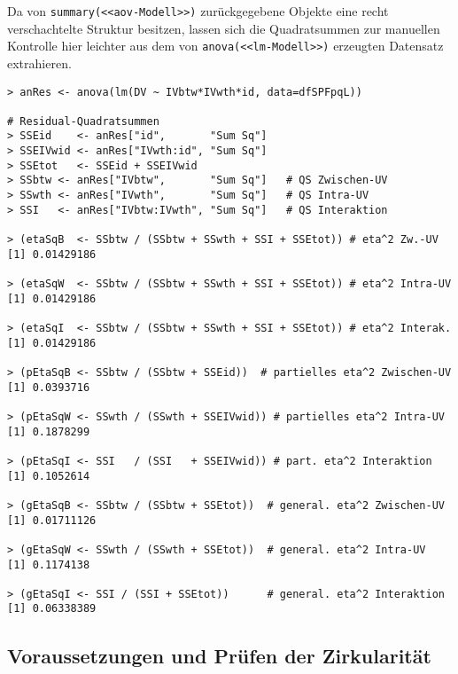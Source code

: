 Da von \lstinline!summary(<<aov-Modell>>)! zurückgegebene Objekte eine recht verschachtelte Struktur besitzen, lassen sich die Quadratsummen zur manuellen Kontrolle hier leichter aus dem von \lstinline!anova(<<lm-Modell>>)! erzeugten Datensatz extrahieren.
\begin{lstlisting}
> anRes <- anova(lm(DV ~ IVbtw*IVwth*id, data=dfSPFpqL))

# Residual-Quadratsummen
> SSEid    <- anRes["id",       "Sum Sq"]
> SSEIVwid <- anRes["IVwth:id", "Sum Sq"]
> SSEtot   <- SSEid + SSEIVwid
> SSbtw <- anRes["IVbtw",       "Sum Sq"]   # QS Zwischen-UV
> SSwth <- anRes["IVwth",       "Sum Sq"]   # QS Intra-UV
> SSI   <- anRes["IVbtw:IVwth", "Sum Sq"]   # QS Interaktion

> (etaSqB  <- SSbtw / (SSbtw + SSwth + SSI + SSEtot)) # eta^2 Zw.-UV
[1] 0.01429186

> (etaSqW  <- SSbtw / (SSbtw + SSwth + SSI + SSEtot)) # eta^2 Intra-UV
[1] 0.01429186

> (etaSqI  <- SSbtw / (SSbtw + SSwth + SSI + SSEtot)) # eta^2 Interak.
[1] 0.01429186

> (pEtaSqB <- SSbtw / (SSbtw + SSEid))  # partielles eta^2 Zwischen-UV
[1] 0.0393716

> (pEtaSqW <- SSwth / (SSwth + SSEIVwid)) # partielles eta^2 Intra-UV
[1] 0.1878299

> (pEtaSqI <- SSI   / (SSI   + SSEIVwid)) # part. eta^2 Interaktion
[1] 0.1052614

> (gEtaSqB <- SSbtw / (SSbtw + SSEtot))  # general. eta^2 Zwischen-UV
[1] 0.01711126

> (gEtaSqW <- SSwth / (SSwth + SSEtot))  # general. eta^2 Intra-UV
[1] 0.1174138

> (gEtaSqI <- SSI / (SSI + SSEtot))      # general. eta^2 Interaktion
[1] 0.06338389
\end{lstlisting}

\subsection{Voraussetzungen und Prüfen der Zirkularität}

